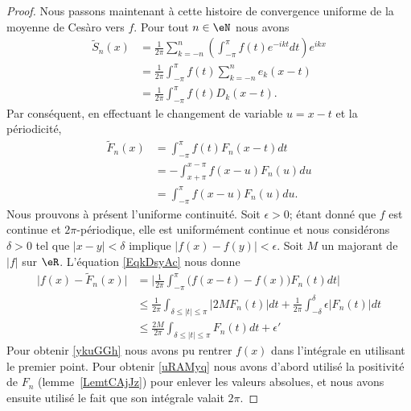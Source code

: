 \begin{proof}
    Nous passons maintenant à cette histoire de convergence uniforme de la moyenne de Cesàro vers \( f\). Pour tout \( n\in \eN\) nous avons
    \begin{subequations}
        \begin{align}
            \tilde  S_n(x)&=\frac{1}{ 2\pi }\sum_{k=-n}^n\left( \int_{-\pi}^{\pi}f(t) e^{-ikt}dt \right) e^{ikx}\\
            &=\frac{1}{ 2\pi }\int_{-\pi}^{\pi}f(t)\sum_{k=-n}^ne_k(x-t)\\
            &=\frac{1}{ 2\pi }\int_{-\pi}^{\pi}f(t)D_k(x-t).
        \end{align}
    \end{subequations}
    Par conséquent, en effectuant le changement de variable \( u=x-t\) et la périodicité,
    \begin{subequations}    \label{EqkDsyAc}
        \begin{align}
            \tilde F_n(x)&=\int_{-\pi}^{\pi}f(t)F_n(x-t)dt\\
            &=-\int_{x+\pi}^{x-\pi}f(x-u)F_n(u)du\\
            &=\int_{-\pi}^{\pi}f(x-u) F_n(u)du.
        \end{align}
    \end{subequations}
    Nous prouvons à présent l'uniforme continuité. Soit \( \epsilon>0\); étant donné que \( f\) est continue et \( 2\pi\)-périodique, elle est uniformément continue et nous considérons \( \delta>0\) tel que \( | x-y |<\delta\) implique \( \big| f(x)-f(y) \big|<\epsilon\). Soit \( M\) un majorant de \( | f |\) sur \( \eR\). L'équation \eqref{EqkDsyAc} nous donne
    \begin{subequations}
        \begin{align}
            \big| f(x)-\tilde F_n(x) \big|&=\big| \frac{1}{ 2\pi }\int_{-\pi}^{\pi}\big( f(x-t)-f(x) \big)F_n(t)dt \big|    \label{ykuGGh}\\
            &\leq\frac{1}{ 2\pi }\int_{\delta\leq| t |\leq \pi}| 2MF_n(t) |dt+\frac{1}{ 2\pi }\int_{-\delta}^{\delta}\epsilon| F_n(t) |dt\\
            &\leq\frac{ 2M }{ 2\pi }\int_{\delta\leq | t |\leq\pi}F_n(t)dt+\epsilon'    \label{uRAMyq}
        \end{align}
    \end{subequations}
    Pour obtenir \eqref{ykuGGh} nous avons pu rentrer \( f(x)\) dans l'intégrale en utilisant le premier point. Pour obtenir \eqref{uRAMyq} nous avons d'abord utilisé la positivité de \( F_n\) (lemme~\ref{LemtCAjJz}) pour enlever les valeurs absolues, et nous avons ensuite utilisé le fait que son intégrale valait \( 2\pi\).


\end{proof}
